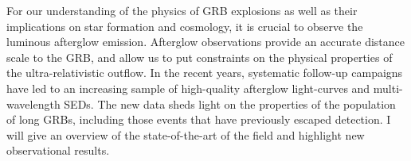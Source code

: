 


\bigskip



\bigskip

\noindent For our understanding of the physics of GRB explosions as well as their implications on star formation and cosmology, it is crucial to observe the luminous afterglow emission. Afterglow observations provide an accurate distance scale to the GRB, and allow us to put constraints on the physical properties of the ultra-relativistic outflow. In the recent years, systematic follow-up campaigns have led to an increasing sample of high-quality afterglow light-curves and multi-wavelength SEDs. The new data sheds light on the properties of the population of long GRBs, including those events that have previously escaped detection.
I will give an overview of the state-of-the-art of the field and highlight new observational results.

